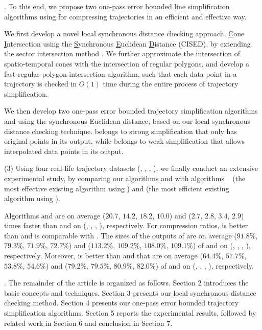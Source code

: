 .
To this end, we propose two one-pass error bounded line simplification algorithms using \sed for compressing trajectories in an efficient and effective way.

 We first develop a novel local synchronous distance checking approach, \ie \underline{C}one \underline{I}ntersection using the \underline{S}ynchronous \underline{E}uclidean \underline{D}istance (CISED), by extending the sector intersection method \cite{Williams:Longest, Sklansky:Cone, Zhao:Sleeve}. We further approximate the intersection of spatio-temporal cones with the intersection of regular polygons, and develop a fast regular polygon intersection algorithm,
such that each data point in a trajectory is checked in $O(1)$ time during the entire process of trajectory simplification.

 We then develop two one-pass error bounded trajectory simplification algorithms \cist and \cista using the synchronous Euclidean distance, based on
our local synchronous distance checking technique. \cist belongs to strong simplification that only has original points in its output, while \cista belongs to weak simplification that allows interpolated data points in its output.


\sstab (3) Using four real-life trajectory datasets (\truck, \sercar, \geolife, \pricar),
we finally conduct an extensive experimental study, by comparing our algorithms \cist and \cista with algorithms \dps~\cite{Meratnia:Spatiotemporal} (the most effective existing \lsa algorithm using \sed) and \squishe \cite{Muckell:Compression} (the most efficient existing \lsa algorithm using \sed).

Algorithms \cist and \cista are on average ($20.7$, $14.2$, $18.2$, $10.0$) and ($2.7$, $2.8$, $3.4$, {$2.9$}) times faster than \dps and \squishe on (\truck, \sercar, \geolife, \pricar), respectively.
%
For compression ratios, \cist is better than \squishe and is comparable with \dps. The sizes of the outputs of \cist are on average ($91.8\%$, $79.3\%$, $71.9\%$, {$72.7\%$}) and ($113.2\%$, $109.2\%$, $108.0\%$, $109.1\%$) of \squishe and \dps on (\truck, \sercar, \geolife, \pricar), respectively. Moreover, \cista is better than \squishe and \dps that are on average ($64.4\%$, $57.7\%$, $53.8\%$, {$54.6\%$}) and ($79.2\%$, $79.5\%$, $80.9\%$, $82.0\%$) of \squishe and \dps on (\truck, \sercar, \geolife, \pricar), respectively.


.
The remainder of the article is organized as follows.
Section 2 introduces the basic concepts and techniques.
Section 3 presents our local synchronous distance checking method.
Section 4 presents our one-pass error bounded trajectory simplification algorithms.
Section 5 reports the experimental results, followed by related work in
Section 6 and conclusion in Section 7.






